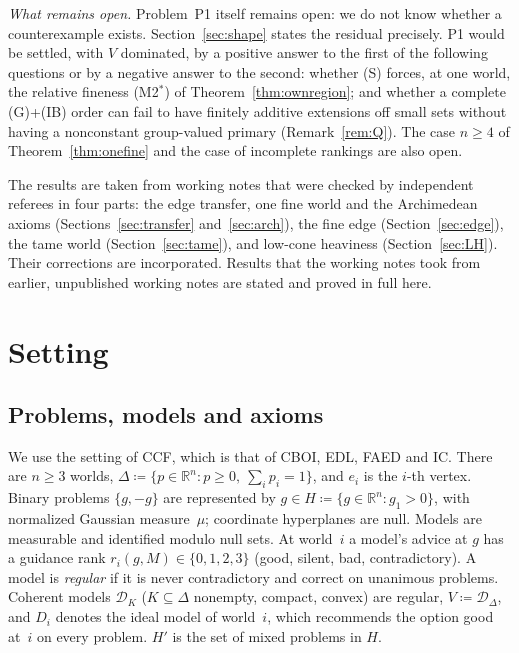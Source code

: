 \documentclass[11pt]{article}
\theoremstyle{definition}\newtheorem{definition}[theorem]{Definition}
\theoremstyle{remark}\newtheorem{remark}[theorem]{Remark}
\newcommand{\R}{\mathbb R}
\newcommand{\Dscr}{\mathcal D}
\begin{document}
\emph{What remains open.} Problem~P1 itself remains open: we do not know
whether a counterexample exists. Section~\ref{sec:shape} states the residual
precisely. P1 would be settled, with $V$ dominated, by a positive answer
to the first of the following questions or by a negative answer to the
second: whether (S) forces, at one world,
the relative fineness (M2$^*$) of Theorem~\ref{thm:ownregion}; and whether a
complete (G)+(IB) order can fail to have finitely additive extensions off
small sets without having a nonconstant group-valued primary
(Remark~\ref{rem:Q}). The case $n\ge4$ of Theorem~\ref{thm:onefine} and the
case of incomplete rankings are also open.

The results are taken from working notes that were checked by independent
referees in four parts: the edge transfer, one fine world and the
Archimedean axioms (Sections~\ref{sec:transfer} and~\ref{sec:arch}), the
fine edge (Section~\ref{sec:edge}), the tame world
(Section~\ref{sec:tame}), and low-cone heaviness (Section~\ref{sec:LH}).
Their corrections are incorporated. Results that the
working notes took from earlier, unpublished working notes are stated and
proved in full here.

\tableofcontents

\section{Setting}\label{sec:setting}

\subsection{Problems, models and axioms}

We use the setting of CCF, which is that of CBOI, EDL, FAED and IC.
There are $n\ge3$ worlds, $\Delta\coloneqq\{p\in\R^n:p\ge0,\ \sum_ip_i=1\}$,
and $e_i$ is the $i$-th vertex. Binary problems $\{g,-g\}$ are represented
by $g\in H\coloneqq\{g\in\R^n:g_1>0\}$, with normalized Gaussian
measure~$\mu$; coordinate hyperplanes are null. Models are measurable and
identified modulo null sets. At world~$i$ a model's advice at $g$ has a
guidance rank $r_i(g,M)\in\{0,1,2,3\}$ (good, silent, bad, contradictory).
A model is \emph{regular} if it is never contradictory and correct on
unanimous problems. Coherent models $\Dscr_K$ ($K\subseteq\Delta$ nonempty,
compact, convex) are regular, $V\coloneqq\Dscr_\Delta$, and $D_i$ denotes
the ideal model of world~$i$, which recommends the option good at~$i$ on
every problem. $H'$ is the set of mixed problems in $H$.
\end{document}
